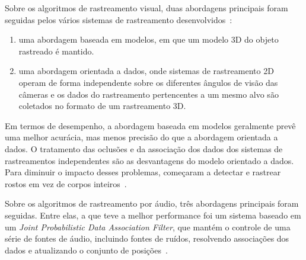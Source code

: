 Sobre os algoritmos de rastreamento visual, duas abordagens principais foram seguidas pelos vários sistemas de rastreamento desenvolvidos~\cite{chil}:
	
	\begin{enumerate}
		\item uma abordagem baseada em modelos, em que um modelo 3D do objeto rastreado é mantido.
		\item  uma abordagem orientada a dados, onde sistemas de rastreamento 2D operam de forma independente sobre os diferentes ângulos de visão das câmeras e os dados do rastreamento pertencentes a um mesmo alvo são coletados no formato de um rastreamento 3D.
	\end{enumerate}

 Em termos de desempenho, a abordagem baseada em modelos geralmente prevê uma melhor acurácia, mas menos precisão do que a abordagem orientada a dados. O tratamento das oclusões e da associação dos dados dos sistemas de rastreamentos independentes são as desvantagens do modelo orientado a dados. Para diminuir o impacto desses problemas, começaram a detectar e rastrear rostos em vez de corpos inteiros~\cite{chil}.

	

Sobre os algoritmos de rastreamento por áudio, três abordagens principais foram seguidas. Entre elas, a que teve a melhor performance foi um sistema baseado em um \textit{Joint Probabilistic Data Association Filter}, que mantém o controle de uma série de fontes de áudio, incluindo fontes de ruídos, resolvendo associações dos dados e atualizando o conjunto de posições~\cite{chil}.

